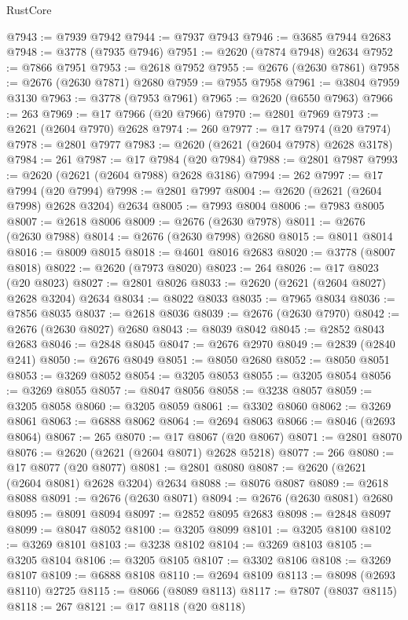 \begin{lexlean}{RustCore}
\begin{coremodule}
@7943 := @7939 @7942
@7944 := @7937 @7943
@7946 := @3685 @7944 @2683
@7948 := @3778 (@7935 @7946)
@7951 := @2620 (@7874 @7948) @2634
@7952 := @7866 @7951
@7953 := @2618 @7952
@7955 := @2676 (@2630 @7861)
@7958 := @2676 (@2630 @7871) @2680
@7959 := @7955 @7958
@7961 := @3804 @7959 @3130
@7963 := @3778 (@7953 @7961)
@7965 := @2620 (@6550 @7963)
@7966 := 263
@7969 := @17 @7966 (@20 @7966)
@7970 := @2801 @7969
@7973 := @2621 (@2604 @7970) @2628
@7974 := 260
@7977 := @17 @7974 (@20 @7974)
@7978 := @2801 @7977
@7983 := @2620 (@2621 (@2604 @7978) @2628 @3178)
@7984 := 261
@7987 := @17 @7984 (@20 @7984)
@7988 := @2801 @7987
@7993 := @2620 (@2621 (@2604 @7988) @2628 @3186)
@7994 := 262
@7997 := @17 @7994 (@20 @7994)
@7998 := @2801 @7997
@8004 := @2620 (@2621 (@2604 @7998) @2628 @3204) @2634
@8005 := @7993 @8004
@8006 := @7983 @8005
@8007 := @2618 @8006
@8009 := @2676 (@2630 @7978)
@8011 := @2676 (@2630 @7988)
@8014 := @2676 (@2630 @7998) @2680
@8015 := @8011 @8014
@8016 := @8009 @8015
@8018 := @4601 @8016 @2683
@8020 := @3778 (@8007 @8018)
@8022 := @2620 (@7973 @8020)
@8023 := 264
@8026 := @17 @8023 (@20 @8023)
@8027 := @2801 @8026
@8033 := @2620 (@2621 (@2604 @8027) @2628 @3204) @2634
@8034 := @8022 @8033
@8035 := @7965 @8034
@8036 := @7856 @8035
@8037 := @2618 @8036
@8039 := @2676 (@2630 @7970)
@8042 := @2676 (@2630 @8027) @2680
@8043 := @8039 @8042
@8045 := @2852 @8043 @2683
@8046 := @2848 @8045
@8047 := @2676 @2970
@8049 := @2839 (@2840 @241)
@8050 := @2676 @8049
@8051 := @8050 @2680
@8052 := @8050 @8051
@8053 := @3269 @8052
@8054 := @3205 @8053
@8055 := @3205 @8054
@8056 := @3269 @8055
@8057 := @8047 @8056
@8058 := @3238 @8057
@8059 := @3205 @8058
@8060 := @3205 @8059
@8061 := @3302 @8060
@8062 := @3269 @8061
@8063 := @6888 @8062
@8064 := @2694 @8063
@8066 := @8046 (@2693 @8064)
@8067 := 265
@8070 := @17 @8067 (@20 @8067)
@8071 := @2801 @8070
@8076 := @2620 (@2621 (@2604 @8071) @2628 @5218)
@8077 := 266
@8080 := @17 @8077 (@20 @8077)
@8081 := @2801 @8080
@8087 := @2620 (@2621 (@2604 @8081) @2628 @3204) @2634
@8088 := @8076 @8087
@8089 := @2618 @8088
@8091 := @2676 (@2630 @8071)
@8094 := @2676 (@2630 @8081) @2680
@8095 := @8091 @8094
@8097 := @2852 @8095 @2683
@8098 := @2848 @8097
@8099 := @8047 @8052
@8100 := @3205 @8099
@8101 := @3205 @8100
@8102 := @3269 @8101
@8103 := @3238 @8102
@8104 := @3269 @8103
@8105 := @3205 @8104
@8106 := @3205 @8105
@8107 := @3302 @8106
@8108 := @3269 @8107
@8109 := @6888 @8108
@8110 := @2694 @8109
@8113 := @8098 (@2693 @8110) @2725
@8115 := @8066 (@8089 @8113)
@8117 := @7807 (@8037 @8115)
@8118 := 267
@8121 := @17 @8118 (@20 @8118)

\end{coremodule}
\end{lexlean}
